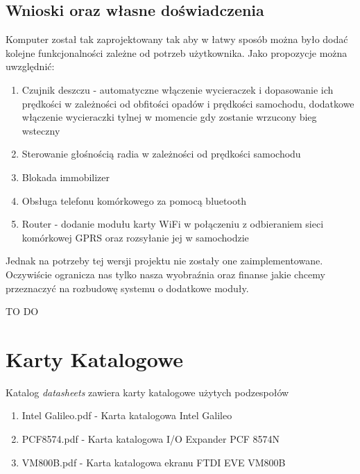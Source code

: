 \documentclass{xmgr}
\begin{document}
\section{Wnioski oraz własne doświadczenia}
Komputer został tak zaprojektowany tak aby w łatwy sposób można było dodać kolejne funkcjonalności zależne od potrzeb użytkownika. Jako propozycje można uwzględnić:
\begin{enumerate}
	\item Czujnik deszczu - automatyczne włączenie wycieraczek i dopasowanie ich prędkości w zależności od obfitości opadów i prędkości samochodu, dodatkowe włączenie wycieraczki tylnej w momencie gdy zostanie wrzucony bieg wsteczny
	\item Sterowanie głośnością radia w zależności od prędkości samochodu
	\item Blokada immobilizer
	\item Obsługa telefonu komórkowego za pomocą bluetooth
	\item Router - dodanie modułu karty WiFi w połączeniu z odbieraniem sieci komórkowej GPRS oraz rozsyłanie jej w samochodzie
\end{enumerate}
Jednak na potrzeby tej wersji projektu nie zostały one zaimplementowane. Oczywiście ogranicza nas tylko nasza wyobraźnia oraz finanse jakie chcemy przeznaczyć na rozbudowę systemu o dodatkowe moduły. 

\summary
TO DO

\appendix
\chapter{Karty Katalogowe}
Katalog \emph{datasheets} zawiera karty katalogowe użytych podzespołów
\begin{enumerate} 
\item Intel Galileo.pdf - Karta katalogowa Intel Galileo
\item PCF8574.pdf - Karta katalogowa I/O Expander PCF 8574N
\item VM800B.pdf - Karta katalogowa ekranu FTDI EVE VM800B
\end{enumerate}
\end{document}
